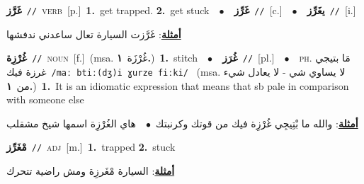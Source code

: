 \documentclass[10pt,a4paper,twoside]{article} %
\begin{document}
\begin{multicols}{2}
{\setlength\topsep{0pt}\textbf{\foreignlanguage{arabic}{غَرَّز}}\ {\color{gray}\texttt{//}\color{black}}\ \textsc{verb}\ [p.]\ \textbf{1.}~get trapped.  \textbf{2.}~get stuck\ \ $\bullet$\ \ \setlength\topsep{0pt}\textbf{\foreignlanguage{arabic}{غَرِّز}}\ {\color{gray}\texttt{//}\color{black}}\ [c.]\ \ $\bullet$\ \ \setlength\topsep{0pt}\textbf{\foreignlanguage{arabic}{يغَرِّز}}\ {\color{gray}\texttt{//}\color{black}}\ [i.]\  \begin{flushright}\color{gray}\foreignlanguage{arabic}{\textbf{\underline{\foreignlanguage{arabic}{أمثلة}}}: غَرَّزت السيارة تعال ساعدني ندفشها}\end{flushright}\color{black}} \vspace{2mm}

{\setlength\topsep{0pt}\textbf{\foreignlanguage{arabic}{غُرْزِة}}\ {\color{gray}\texttt{//}\color{black}}\ \textsc{noun}\ [f.]\ \color{gray}(msa. \foreignlanguage{arabic}{غُرْزَة}~\foreignlanguage{arabic}{\textbf{١.}})\color{black}\ \textbf{1.}~stitch\ \ $\bullet$\ \ \setlength\topsep{0pt}\textbf{\foreignlanguage{arabic}{غُرَز}}\ {\color{gray}\texttt{//}\color{black}}\ [pl.]\ \ $\bullet$\ \ \textsc{ph.} \color{gray} \foreignlanguage{arabic}{مَا بتيجي غرزة فيك}\color{black}\ {\color{gray}\texttt{/{\sffamily maː btiː(dʒ)i ɣurze fiːki}/}\color{black}}\ \color{gray} (msa. \foreignlanguage{arabic}{لا يساوي شي - لا يعادل شيء من}~\foreignlanguage{arabic}{\textbf{١.}})\color{black}\ \textbf{1.}~It is an idiomatic expression that means that sb pale in comparison with someone else\  \begin{flushright}\color{gray}\foreignlanguage{arabic}{\textbf{\underline{\foreignlanguage{arabic}{أمثلة}}}: والله ما بْتِيجِي غُرْزِة فيك من قوتك وكرنبتك\ $\bullet$\ \  هاي الغُرْزِة اسمها شيخ مشقلب}\end{flushright}\color{black}} \vspace{2mm}

{\setlength\topsep{0pt}\textbf{\foreignlanguage{arabic}{مْغَرِّز}}\ {\color{gray}\texttt{//}\color{black}}\ \textsc{adj}\ [m.]\ \textbf{1.}~trapped  \textbf{2.}~stuck\  \begin{flushright}\color{gray}\foreignlanguage{arabic}{\textbf{\underline{\foreignlanguage{arabic}{أمثلة}}}: السيارة مْغَرزِة ومش راضية تتحرك}\end{flushright}\color{black}} \vspace{2mm}


\end{multicols}
\end{document}
